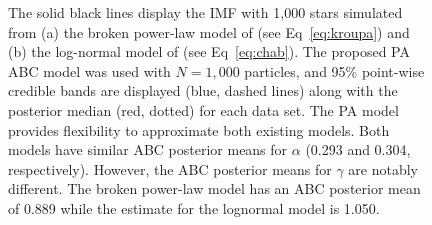 \documentclass[ejs]{imsart}
\numberwithin{equation}{section}
\theoremstyle{plain}
\begin{document}
\begin{figure}
%
\caption{The solid black lines display the IMF with 1,000 stars simulated from (a) the broken power-law model of \cite{kroupa2001} (see Eq~\eqref{eq:kroupa}) and (b) the log-normal model of \cite{Chabrier:2003oq, Chabrier:2003om}  (see Eq~\eqref{eq:chab}).  The proposed PA ABC model was used with $N = 1,000$ particles, and 95\% point-wise credible bands are displayed (blue, dashed lines) along with the posterior median (red, dotted) for each data set.  The PA model provides flexibility to approximate both existing models.
Both models have similar ABC posterior means for $\alpha$ (0.293 and 0.304, respectively).  However, the ABC posterior means for $\gamma$ are notably different.  The broken power-law model has an ABC posterior mean of 0.889 while the estimate for the lognormal model is 1.050.
	}\label{fig:otherModels}
\end{figure}
\end{document}

